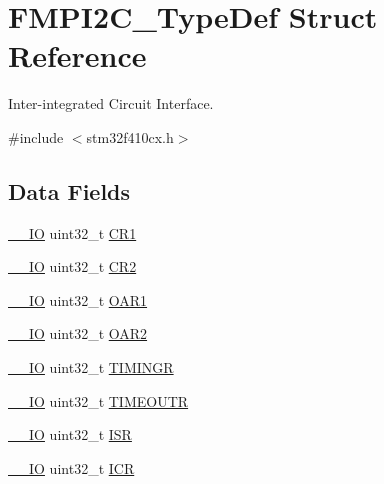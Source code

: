 \hypertarget{struct_f_m_p_i2_c___type_def}{}\section{F\+M\+P\+I2\+C\+\_\+\+Type\+Def Struct Reference}
\label{struct_f_m_p_i2_c___type_def}


Inter-\/integrated Circuit Interface.  




{\ttfamily \#include $<$stm32f410cx.\+h$>$}

\subsection*{Data Fields}
\begin{DoxyCompactItemize}
\item 
\hyperlink{core__sc300_8h_aec43007d9998a0a0e01faede4133d6be}{\+\_\+\+\_\+\+IO} uint32\+\_\+t \hyperlink{struct_f_m_p_i2_c___type_def_ab0ec7102960640751d44e92ddac994f0}{C\+R1}
\item 
\hyperlink{core__sc300_8h_aec43007d9998a0a0e01faede4133d6be}{\+\_\+\+\_\+\+IO} uint32\+\_\+t \hyperlink{struct_f_m_p_i2_c___type_def_afdfa307571967afb1d97943e982b6586}{C\+R2}
\item 
\hyperlink{core__sc300_8h_aec43007d9998a0a0e01faede4133d6be}{\+\_\+\+\_\+\+IO} uint32\+\_\+t \hyperlink{struct_f_m_p_i2_c___type_def_a08b4be0d626a00f26bc295b379b3bba6}{O\+A\+R1}
\item 
\hyperlink{core__sc300_8h_aec43007d9998a0a0e01faede4133d6be}{\+\_\+\+\_\+\+IO} uint32\+\_\+t \hyperlink{struct_f_m_p_i2_c___type_def_ab5c57ffed0351fa064038939a6c0bbf6}{O\+A\+R2}
\item 
\hyperlink{core__sc300_8h_aec43007d9998a0a0e01faede4133d6be}{\+\_\+\+\_\+\+IO} uint32\+\_\+t \hyperlink{struct_f_m_p_i2_c___type_def_a5576a30ffbe0a0800ce7788610327677}{T\+I\+M\+I\+N\+GR}
\item 
\hyperlink{core__sc300_8h_aec43007d9998a0a0e01faede4133d6be}{\+\_\+\+\_\+\+IO} uint32\+\_\+t \hyperlink{struct_f_m_p_i2_c___type_def_a95187d83f061ebbddd8668d0db3fbaa5}{T\+I\+M\+E\+O\+U\+TR}
\item 
\hyperlink{core__sc300_8h_aec43007d9998a0a0e01faede4133d6be}{\+\_\+\+\_\+\+IO} uint32\+\_\+t \hyperlink{struct_f_m_p_i2_c___type_def_ab3c49a96815fcbee63d95e1e74f20e75}{I\+SR}
\item 
\hyperlink{core__sc300_8h_aec43007d9998a0a0e01faede4133d6be}{\+\_\+\+\_\+\+IO} uint32\+\_\+t \hyperlink{struct_f_m_p_i2_c___type_def_a0a8c8230846fd8ff154b9fde8dfa0399}{I\+CR}

\end{DoxyCompactItemize}
